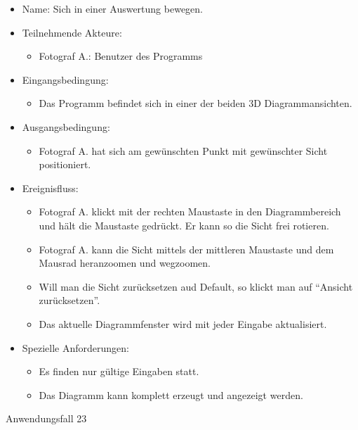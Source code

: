 \begin{itemize}
\begin{itemize}
\item Name: Sich in einer Auswertung bewegen.
\item Teilnehmende Akteure:
\begin{itemize}
\item Fotograf A.: Benutzer des Programms
\end{itemize}
\item Eingangsbedingung:
\begin{itemize}
\item Das Programm befindet sich in einer der beiden 3D Diagrammansichten.
\end{itemize}
\item Ausgangsbedingung:
\begin{itemize}
\item Fotograf A. hat sich am gewünschten Punkt mit gewünschter Sicht positioniert.
\end{itemize}
\item Ereignisfluss:
\begin{itemize}
\item Fotograf A. klickt mit der rechten Maustaste in den Diagrammbereich und hält die Maustaste gedrückt. Er kann so die Sicht frei rotieren.
\item Fotograf A. kann die Sicht mittels der mittleren Maustaste und dem Mausrad heranzoomen und wegzoomen.
\item Will man die Sicht zurücksetzen aud Default, so klickt man auf "`Ansicht zurücksetzen"'.
\item Das aktuelle Diagrammfenster wird mit jeder Eingabe aktualisiert.
\end{itemize}
\item Spezielle Anforderungen:
\begin{itemize}
\item Es finden nur gültige Eingaben statt.
\item Das Diagramm kann komplett erzeugt und angezeigt werden.
\end{itemize}
\end{itemize}
 
\begin{description}
\item[Anwendungsfall 23]
\end{description}
 

\end{itemize}
